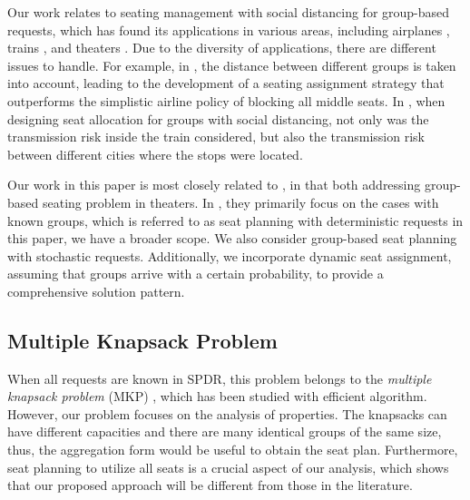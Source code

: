 Our work relates to seating management with social distancing for group-based requests, which has found its applications in various areas, including airplanes \cite{salari2022social}, trains \cite{haque2023social}, and theaters \cite{blom2022filling}. Due to the diversity of applications, there are different issues to handle. For example, in \cite{salari2022social}, the distance between different groups is taken into account, leading to the development of a seating assignment strategy that outperforms the simplistic airline policy of blocking all middle seats. In \cite{haque2023social}, when designing seat allocation for groups with social distancing, not only was the transmission risk inside the train considered, but also the transmission risk between different cities where the stops were located.


Our work in this paper is most closely related to \cite{blom2022filling}, in that both addressing group-based seating problem in theaters. In \cite{blom2022filling}, they primarily focus on the cases with known groups, which is referred to as seat planning with deterministic requests in this paper, we have a broader scope. We also consider group-based seat planning with stochastic requests. Additionally, we incorporate dynamic seat assignment, assuming that groups arrive with a certain probability, to provide a comprehensive solution pattern.


\subsection{Multiple Knapsack Problem}
When all requests are known in SPDR, this problem belongs to the \textit{multiple knapsack problem} (MKP) \cite{ferreira1996solving, pisinger1999exact}, which has been studied with efficient algorithm. However, our problem focuses on the analysis of properties. The knapsacks can have different capacities and there are many identical groups of the same size, thus, the aggregation form would be useful to obtain the seat plan. Furthermore, seat planning to utilize all seats is a crucial aspect of our analysis, which shows that our proposed approach will be different from those in the literature.



